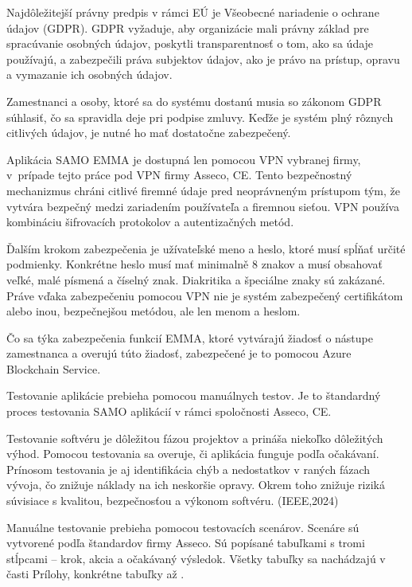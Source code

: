 Najdôležitejší právny predpis v rámci EÚ je Všeobecné nariadenie o ochrane údajov (GDPR). GDPR vyžaduje, aby organizácie mali právny základ pre spracúvanie osobných údajov, poskytli transparentnosť o tom, ako sa údaje používajú, a zabezpečili práva subjektov údajov, ako je právo na prístup, opravu a vymazanie ich osobných údajov.

Zamestnanci a osoby, ktoré sa do systému dostanú musia so zákonom GDPR súhlasiť, čo sa spravidla deje pri podpise zmluvy. Keďže je systém plný rôznych citlivých údajov, je nutné ho mať dostatočne zabezpečený.

Aplikácia SAMO EMMA je dostupná len pomocou VPN vybranej firmy, v~prípade tejto práce pod VPN firmy Asseco, CE. Tento bezpečnostný mechanizmus chráni citlivé firemné údaje pred neoprávneným prístupom tým, že vytvára bezpečný  medzi zariadením používateľa a firemnou sieťou. VPN používa kombináciu šifrovacích protokolov a autentizačných metód.

Ďalším krokom zabezpečenia je užívateľské meno a heslo, ktoré musí spĺňať určité podmienky. Konkrétne heslo musí mať minimalně 8 znakov a musí obsahovať veľké, malé písmená a číselný znak. Diakritika a špeciálne znaky sú zakázané. Práve vďaka zabezpečeniu pomocou VPN nie je systém zabezpečený certifikátom alebo inou, bezpečnejšou metódou, ale len menom a heslom.

Čo sa týka zabezpečenia funkcií EMMA, ktoré vytvárajú žiadosť o nástupe zamestnanca a overujú túto žiadosť, zabezpečené je to pomocou Azure Blockchain Service.


Testovanie aplikácie prebieha pomocou manuálnych testov. Je to štandardný proces testovania SAMO aplikácií v rámci spoločnosti Asseco, CE. 

Testovanie softvéru je dôležitou fázou projektov a prináša niekoľko dôležitých výhod. Pomocou testovania sa overuje, či aplikácia funguje podľa očakávaní. Prínosom testovania je aj identifikácia chýb a nedostatkov v raných fázach vývoja, čo znižuje náklady na ich neskoršie opravy. Okrem toho znižuje riziká súvisiace s kvalitou, bezpečnosťou a výkonom softvéru. \scr(IEEE,2024)

Manuálne testovanie prebieha pomocou testovacích scenárov. Scenáre sú vytvorené podľa štandardov firmy Asseco. Sú popísané tabuľkami s tromi stĺpcami -- krok, akcia a očakávaný výsledok. Všetky tabuľky sa nachádzajú v časti Prílohy, konkrétne tabuľky  až .

